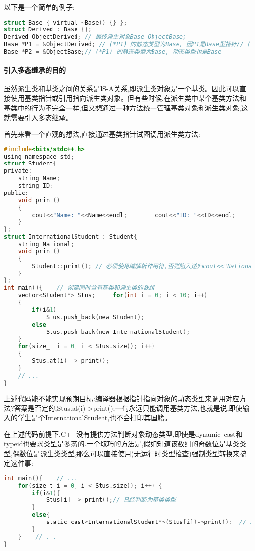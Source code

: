 \documentclass[UTF8]{ctexart}
\begin{document}
以下是一个简单的例子:
\begin{lstlisting}[language = C,basicstyle=\small\ttfamily]
struct Base { virtual ~Base() {} };
struct Derived : Base {};
Derived ObjectDerived; // 最终派生对象Base ObjectBase;
Base *P1 = &ObjectDerived; // (*P1) 的静态类型为Base, 因P1是Base型指针// (*P1) 的动态类型为Derived, 因其指向一个派生类对象
Base *P2 = &ObjectBase;// (*P1) 的静态类型为Base, 动态类型也是Base
\end{lstlisting}

\paragraph{引入多态继承的目的}
虽然派生类和基类之间的关系是IS-A关系,即派生类对象是一个基类。因此可以直接使用基类指针或引用指向派生类对象。但有些时候,在派生类中某个基类方法和基类中的行为不完全一样,但又想通过一种方法统一管理基类对象和派生类对象,这就需要引入多态继承。

首先来看一个直观的想法,直接通过基类指针试图调用派生类方法:
\begin{lstlisting}[language = C,basicstyle=\small\ttfamily]
#include<bits/stdc++.h>
using namespace std;
struct Student{    
private:    
    string Name;    
    string ID;
public:    
    void print()    
    {        
        cout<<"Name: "<<Name<<endl;        cout<<"ID: "<<ID<<endl;
    }
};
struct InternationalStudent : Student{   
    string National;
    void print()    
    {        
        Student::print(); // 必须使用域解析作用符,否则陷入递归cout<<"National: "<<National<<endl;    
    }
};
int main(){    // 创建同时含有基类和派生类的数组    
    vector<Student*> Stus;     for(int i = 0; i < 10; i++) 
    {        
        if(i&1)
            Stus.push_back(new Student);      
        else 
            Stus.push_back(new InternationalStudent);
    }
    for(size_t i = 0; i < Stus.size(); i++)     
    {        
        Stus.at(i) -> print();
    }
    // ...
}
\end{lstlisting}
上述代码能不能实现预期目标:编译器根据指针指向对象的动态类型来调用对应方法?答案是否定的,Stus.at(i)->print();一句永远只能调用基类方法,也就是说,即使输入的学生是个InternationalStudent,也不会打印其国籍。

在上述代码前提下,C++没有提供方法判断对象动态类型,即使是dynamic\verb|_|cast和typeid也要求类型是多态的.一个取巧的方法是,假如知道该数组的奇数位是基类类型,偶数位是派生类类型,那么可以直接使用(无运行时类型检查)强制类型转换来搞定这件事:
\begin{lstlisting}[language = C,basicstyle=\small\ttfamily]
int main(){    // ...  
    for(size_t i = 0; i < Stus.size(); i++) {        
        if(i&1){            
            Stus[i] -> print();// 已经判断为基类类型  
        }      
        else{ 
            static_cast<InternationalStudent*>(Stus[i])->print();  // 或(InternationalStudent*)(Stus[i])->print();        
        }    
    }    // ...
}
\end{lstlisting}
\end{document}
